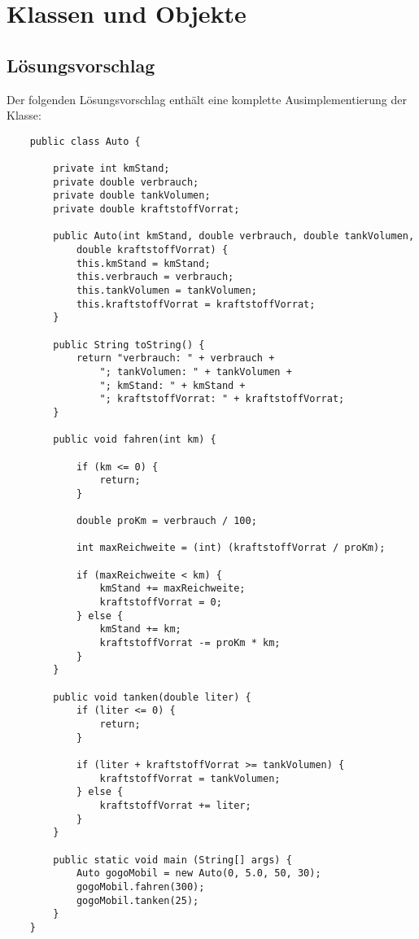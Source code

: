 \chapter{Klassen und Objekte}

\section{Lösungsvorschlag}

Der folgenden Lösungsvorschlag enthält eine komplette Ausimplementierung der Klasse:

\begin{verbatim}
    public class Auto {

        private int kmStand;
        private double verbrauch;
        private double tankVolumen;
        private double kraftstoffVorrat;

        public Auto(int kmStand, double verbrauch, double tankVolumen,
            double kraftstoffVorrat) {
            this.kmStand = kmStand;
            this.verbrauch = verbrauch;
            this.tankVolumen = tankVolumen;
            this.kraftstoffVorrat = kraftstoffVorrat;
        }

        public String toString() {
            return "verbrauch: " + verbrauch +
                "; tankVolumen: " + tankVolumen +
                "; kmStand: " + kmStand +
                "; kraftstoffVorrat: " + kraftstoffVorrat;
        }

        public void fahren(int km) {

            if (km <= 0) {
                return;
            }

            double proKm = verbrauch / 100;

            int maxReichweite = (int) (kraftstoffVorrat / proKm);

            if (maxReichweite < km) {
                kmStand += maxReichweite;
                kraftstoffVorrat = 0;
            } else {
                kmStand += km;
                kraftstoffVorrat -= proKm * km;
            }
        }

        public void tanken(double liter) {
            if (liter <= 0) {
                return;
            }

            if (liter + kraftstoffVorrat >= tankVolumen) {
                kraftstoffVorrat = tankVolumen;
            } else {
                kraftstoffVorrat += liter;
            }
        }

        public static void main (String[] args) {
            Auto gogoMobil = new Auto(0, 5.0, 50, 30);
            gogoMobil.fahren(300);
            gogoMobil.tanken(25);
        }
    }
\end{verbatim}\\

